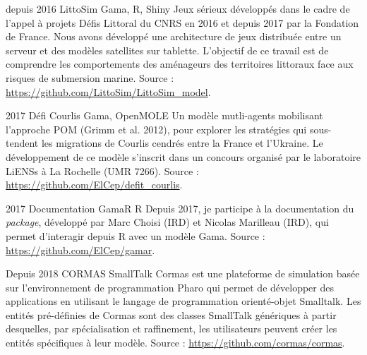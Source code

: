 \documentclass[]{cv-etienne}
\begin{document}
\begin{entrylist}
\entry
{depuis 2016}
{LittoSim}
{Gama, R, Shiny}
{
Jeux sérieux développés dans le cadre de l'appel à projets Défis Littoral du CNRS en 2016 et depuis 2017 par la Fondation de France. Nous avons développé une architecture de jeux distribuée entre un serveur et des modèles satellites sur tablette. L'objectif de ce travail est de comprendre les comportements des aménageurs des territoires littoraux face aux risques de submersion marine. Source : \url{https://github.com/LittoSim/LittoSim_model}.
}
\end{entrylist}
\begin{entrylist}
\entry
{2017}
{Défi Courlis}
{Gama, OpenMOLE}
{
Un modèle mutli-agents mobilisant l'approche POM (Grimm et al. 2012), pour explorer les stratégies qui sous-tendent les migrations de Courlis cendrés entre la France et l'Ukraine. Le développement de ce modèle s'inscrit dans un concours organisé par le laboratoire LiENSs à La Rochelle (UMR 7266). Source : \url{https://github.com/ElCep/defit_courlis}.
}
\end{entrylist}
\begin{entrylist}
\entry
{2017}
{Documentation GamaR}
{R}
{
Depuis 2017, je participe à la documentation du \textit{package}, développé par Marc Choisi (IRD) et Nicolas Marilleau (IRD), qui permet d'interagir depuis R avec un modèle Gama. Source : \url{https://github.com/ElCep/gamar}.
}
\end{entrylist}
\begin{entrylist}
\entry
{Depuis 2018}
{CORMAS}
{SmallTalk}
{
 Cormas est une plateforme de simulation basée sur l'environnement de programmation Pharo qui permet de développer des applications en utilisant le langage de programmation orienté-objet Smalltalk. Les entités pré-définies de Cormas sont des classes SmallTalk génériques à partir desquelles, par spécialisation et raffinement, les utilisateurs peuvent créer les entités spécifiques à leur modèle. Source : \url{https://github.com/cormas/cormas}.
}
\end{entrylist}
\end{document}

